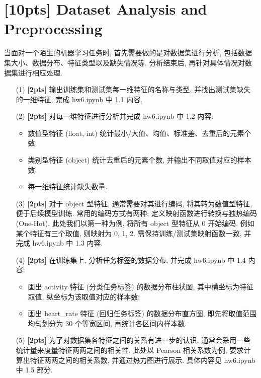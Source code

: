 \documentclass[a4paper,UTF8]{article}
\numberwithin{equation}{section}
\numberwithin{equation}{section}
\theoremstyle{definition}
\begin{document}
\newpage

\section{[10pts] Dataset Analysis and Preprocessing}

当面对一个陌生的机器学习任务时, 首先需要做的是对数据集进行分析, 包括数据集大小、数据分布、特征类型以及缺失情况等. 分析结束后, 再针对具体情况对数据集进行相应处理.

\begin{enumerate}
    \item[(1)] \textbf{[2pts]} 输出训练集和测试集每一维特征的名称与类型, 并找出测试集缺失的一维特征, 完成 hw6.ipynb 中 1.1 内容. 
    \item[(2)] \textbf{[2pts]} 对每一维特征进行分析并完成 hw6.ipynb 中 1.2 内容:
    \begin{itemize}
        \item 数值型特征 (float, int) 统计最小/大值、均值、标准差、去重后的元素个数;
        \item 类别型特征 (object) 统计去重后的元素个数, 并输出不同取值对应的样本数;
        \item 每一维特征统计缺失数量.
    \end{itemize}
    \item[(3)] \textbf{[2pts]} 对于 object 型特征, 通常需要对其进行编码, 将其转为数值型特征, 便于后续模型训练. 常用的编码方式有两种: 定义映射函数进行转换与独热编码 (One-Hot).
    此处我们以第一种为例, 将所有 object 型特征从 0 开始编码, 例如某个特征有三个取值, 则映射为 0, 1, 2. 需保持训练/测试集映射函数一致, 并完成 hw6.ipynb 中 1.3 内容.
    \item[(4)] \textbf{[2pts]} 在训练集上, 分析任务标签的数据分布, 并完成 hw6.ipynb 中 1.4 内容:
    \begin{itemize}
        \item 画出 activity 特征 (分类任务标签) 的数据分布柱状图, 其中横坐标为特征取值, 纵坐标为该取值对应的样本数;
        \item 画出 heart\_rate 特征 (回归任务标签) 的数据分布直方图, 即先将取值范围均匀划分为 30 个等宽区间, 再统计各区间内样本数.
    \end{itemize}
    \item[(5)] \textbf{[2pts]} 为了对数据集各特征之间的关系有进一步的认识, 通常会采用一些统计量来度量特征两两之间的相关性.
    此处以 Pearson 相关系数为例, 要求计算出特征两两之间的相关系数, 并通过热力图进行展示. 具体内容见 hw6.ipynb 中 1.5 部分.
\end{enumerate}
\end{document}
